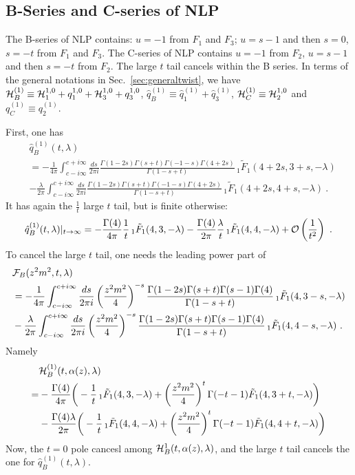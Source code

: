 \documentclass[a4paper,11pt]{article}
\begin{document}
\subsection{B-Series and C-series of NLP}
The B-series of NLP contains: $u=-1$ from $F_1$ and $F_3$; $u=s-1$ and then $s=0$, $s=-t$ from $F_1$ and $F_3$. The C-series of NLP contains $u=-1$ from $F_2$, $u=s-1$ and then $s=-t$ from $F_2$. The large $t$ tail cancels within the B series. In terms of the general notations in Sec.~\ref{sec:generaltwist}, we have ${\cal H}_B^{(1)}\equiv {\cal H}_1^{1,0}+q_1^{1,0}+{\cal H}_3^{1,0}+q_3^{1,0}$, $\hat q_B^{(1)} \equiv \hat q_1^{(1)}+\hat q_3^{(1)}$, ${\cal H}_C^{(1)} \equiv {\cal H}_2^{1,0}$ and $q_C^{(1)} \equiv q_2^{(1)}$. 

First, one has
\begin{align}\label{eq:qb}
&\hat q^{(1)}_B(t,\lambda)\nonumber \\ 
&=-\frac{1}{4\pi}\int_{c-i\infty}^{c+i\infty} \frac{ds}{2\pi i} \frac{\Gamma(1-2s)\Gamma(s+t)\Gamma(-1-s)\Gamma(4+2s)}{\Gamma(1-s+t)}\,_1\tilde F_1(4+2s,3+s,-\lambda) \nonumber \\ 
&-\frac{\lambda}{2\pi}\int_{c-i\infty}^{c+i\infty} \frac{ds}{2\pi i} \frac{\Gamma(1-2s)\Gamma(s+t)\Gamma(-1-s)\Gamma(4+2s)}{\Gamma(1-s+t)}\,_1\tilde F_1(4+2s,4+s,-\lambda) \ .
\end{align}
It has again the $\frac{1}{t}$ large $t$ tail, but is finite otherwise: 
\begin{align}
\hat q^{(1)}_B(t,\lambda)|_{t\rightarrow \infty}=-\frac{\Gamma(4)}{4\pi}\frac{1}{t}\,_1\tilde F_1(4,3,-\lambda) -\frac{\Gamma(4)}{2\pi}\frac{\lambda}{t}\,_1\tilde F_1(4,4,-\lambda)+{\cal O}\left(\frac{1}{t^2}\right) \ .
\end{align}
To cancel the large $t$ tail, one needs the leading power part of 
\begin{align}
&{\cal F}_B(z^2m^2,t,\lambda)\nonumber \\ 
&=-\frac{1}{4\pi}\int_{c-i\infty}^{c+i\infty} \frac{ds}{2\pi i} \left(\frac{z^2m^2}{4}\right)^{-s} \frac{\Gamma(1-2s)\Gamma(s+t)\Gamma(s-1)\Gamma(4)}{\Gamma(1-s+t)}\,_1\tilde F_1(4,3-s,-\lambda) \nonumber \\ 
&-\frac{\lambda}{2\pi}\int_{c-i\infty}^{c+i\infty} \frac{ds}{2\pi i} \left(\frac{z^2m^2}{4}\right)^{-s} \frac{\Gamma(1-2s)\Gamma(s+t)\Gamma(s-1)\Gamma(4)}{\Gamma(1-s+t)}\,_1\tilde F_1(4,4-s,-\lambda) \ .
\end{align}
Namely
\begin{align}\label{eq:hb}
&{\cal H}^{(1)}_B(t,\alpha(z),\lambda)\nonumber \\ =&-\frac{\Gamma(4)}{4\pi}\bigg(-\frac{1}{t}\,_1\tilde F_1(4,3,-\lambda) +\left(\frac{z^2m^2}{4}\right)^{t}\Gamma(-t-1)\tilde F_1(4,3+t,-\lambda)\bigg) \nonumber \\ 
&-\frac{\Gamma(4)\lambda}{2\pi}\bigg(-\frac{1}{t}\,_1\tilde F_1(4,4,-\lambda) +\left(\frac{z^2m^2}{4}\right)^{t}\Gamma(-t-1)\tilde F_1(4,4+t,-\lambda)\bigg)
\end{align}
Now, the $t=0$ pole cancesl among ${\cal H}^{1}_B(t,\alpha(z),\lambda)$, and the large $t$ tail cancels the one for $\hat q_B^{(1)}(t,\lambda)$. 
\end{document}

